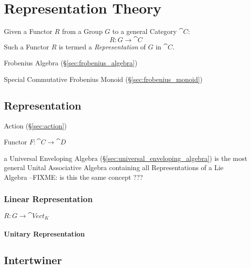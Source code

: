 \section{Representation Theory}\label{sec:representation_theory}

Given a Functor $R$ from a Group $G$ to a general Category
$\cat{C}$:
\[
    R : G \rightarrow \cat{C}
\]
Such a Functor $R$ is termed a \emph{Representation} of $G$ in
$\cat{C}$.

Frobenius Algebra (\S\ref{sec:frobenius_algebra})

Special Commutative Frobenius Monoid (\S\ref{sec:frobenius_monoid})



\subsection{Representation}\label{sec:representation}

Action (\S\ref{sec:action})

Functor $F : \cat{C} \rightarrow \cat{D}$

\fist a Universal Enveloping Algebra (\S\ref{sec:universal_enveloping_algebra})
is the most general Unital Associative Algebra containing all Representations
of a Lie Algebra
--FIXME: is this the same concept ???




\subsubsection{Linear Representation}\label{sec:linear_representation}

$R : G \rightarrow \cat{Vect}_K$



\paragraph{Unitary Representation}\label{sec:unitary_representation}



\subsection{Intertwiner}\label{sec:intertwiner}

